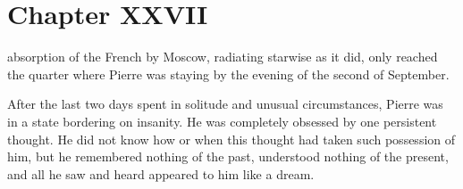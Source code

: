 
\chapter*{Chapter XXVII} \ifaudio {}
\fi

 absorption of the French by Moscow, radiating starwise as it
did, only reached the quarter where Pierre was staying by the
evening of the second of September.

After the last two days spent in solitude and unusual
circumstances, Pierre was in a state bordering on insanity. He
was completely obsessed by one persistent thought. He did not
know how or when this thought had taken such possession of him,
but he remembered nothing of the past, understood nothing of the
present, and all he saw and heard appeared to him like a dream.

